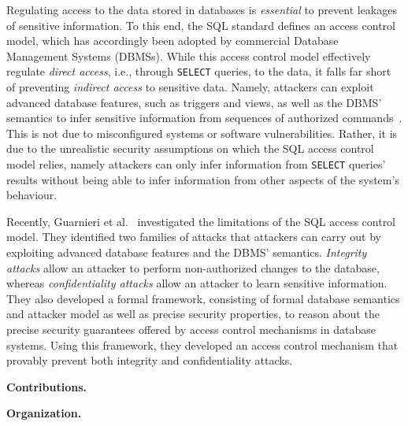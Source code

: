 \medskip
{}  
Regulating access to the data stored in databases is \emph{essential} to prevent leakages of sensitive information.
%
To this end, the SQL standard defines an access control model, which has accordingly been adopted by commercial Database Management Systems (DBMSs).
%
While this access control model effectively regulate \emph{direct access}, i.e., through \texttt{SELECT} queries, to the data, it falls far short of preventing \emph{indirect access} to sensitive data.
%
Namely, attackers can exploit advanced database features, such as triggers and views, as well as the DBMS' semantics to infer sensitive information from sequences of authorized commands~\cite{guarnieri2016strong, ..., ..., ...}.
%  
This is not due to misconfigured systems or software vulnerabilities.
%
Rather, it is due to the  unrealistic security assumptions on which the SQL access control model relies, namely attackers can only infer information from \texttt{SELECT} queries' results without being able to infer information from other aspects of the system's behaviour.

Recently, Guarnieri et al.~\cite{guarnieri2016strong} investigated the limitations of the SQL access control model.
%
They identified two families of attacks that attackers can carry out by exploiting advanced database features and  the DBMS' semantics.  
%
\emph{Integrity attacks} allow an attacker to perform non-authorized changes to the database, whereas \emph{confidentiality attacks} allow an attacker to learn sensitive information.
%
They also developed a formal framework, consisting of formal database semantics and attacker model as well as precise security properties, to reason about the precise security guarantees offered by access control mechanisms in database systems.
%
Using this framework, they developed an access control mechanism that provably prevent both integrity and confidentiality attacks.


\smallskip
\noindent
{\bf Contributions.}
%

\smallskip
\noindent
{\bf Organization.}
